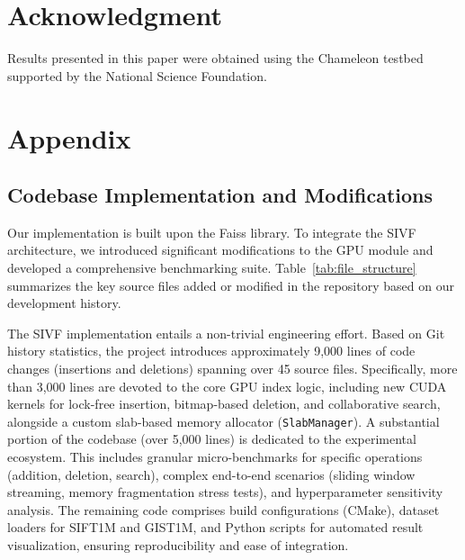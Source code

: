 \documentclass[sigconf,nonacm]{acmart}
\theoremstyle{plain}
\theoremstyle{definition}
\theoremstyle{remark}
\begin{document}


\section*{Acknowledgment}
Results presented in this paper were obtained using the Chameleon testbed supported by the National Science Foundation.




\newpage
\appendix

\section{Appendix}

\subsection{Codebase Implementation and Modifications}
\label{app:codebase}

Our implementation is built upon the Faiss library. To integrate the SIVF architecture, we introduced significant modifications to the GPU module and developed a comprehensive benchmarking suite. Table~\ref{tab:file_structure} summarizes the key source files added or modified in the repository based on our development history.

The SIVF implementation entails a non-trivial engineering effort. Based on Git history statistics, the project introduces approximately 9,000 lines of code changes (insertions and deletions) spanning over 45 source files. Specifically, more than 3,000 lines are devoted to the core GPU index logic, including new CUDA kernels for lock-free insertion, bitmap-based deletion, and collaborative search, alongside a custom slab-based memory allocator (\texttt{SlabManager}). A substantial portion of the codebase (over 5,000 lines) is dedicated to the experimental ecosystem. This includes granular micro-benchmarks for specific operations (addition, deletion, search), complex end-to-end scenarios (sliding window streaming, memory fragmentation stress tests), and hyperparameter sensitivity analysis. The remaining code comprises build configurations (CMake), dataset loaders for SIFT1M and GIST1M, and Python scripts for automated result visualization, ensuring reproducibility and ease of integration.
\end{document}
